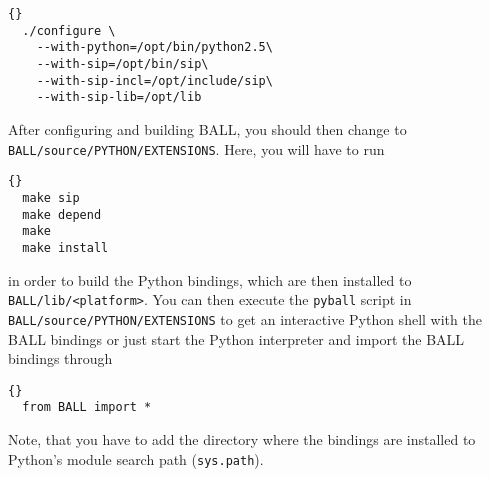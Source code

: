 \begin{lstlisting}{}
  ./configure \
    --with-python=/opt/bin/python2.5\
    --with-sip=/opt/bin/sip\
    --with-sip-incl=/opt/include/sip\
    --with-sip-lib=/opt/lib
\end{lstlisting}

\noindent
After configuring and building BALL, you should then change to {\tt
BALL/source/PYTHON/EXTENSIONS}. Here, you will have to run

\begin{lstlisting}{}
  make sip
  make depend
  make
  make install
\end{lstlisting}

\noindent
in order to build the Python bindings, which are then installed to {\tt
BALL/lib/<platform>}. 
You can then execute the {\tt pyball} script in {\tt
BALL/source/PYTHON/EXTENSIONS} to get an interactive Python shell with the
BALL bindings or just start the Python interpreter and import the BALL
bindings through

\begin{lstlisting}{}
  from BALL import *
\end{lstlisting}

\noindent
Note, that you have to add the directory where the bindings are installed to
Python's module search path ({\tt sys.path}).
